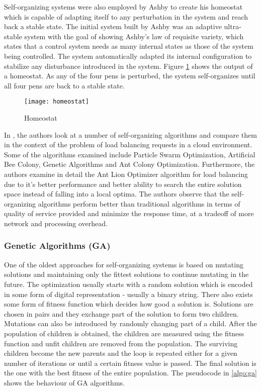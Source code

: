 Self-organizing systems were also employed by Ashby to create his homeostat \cite{ashby:homeostat} which is capable of adapting itself to any perturbation in the system and reach back a stable state. The initial system built by Ashby was an adaptive ultra-stable system with the goal of showing Ashby's law of requisite variety, which states that a control system needs as many internal states as those of the system being controlled. The system automatically adapted its internal configuration to stabilize any disturbance introduced in the system. Figure \ref{fig:homeostat} shows the output of a homeostat. As any of the four pens is perturbed, the system self-organizes until all four pens are back to a stable state.

\begin{figure}
	\centering
		\texttt{[image: homeostat]}
	\caption{Homeostat}
	\label{fig:homeostat}
\end{figure}

In \cite{selforg:survey}, the authors look at a number of self-organizing algorithms and compare them in the context of the problem of load balancing requests in a cloud environment. Some of the algorithms examined include Particle Swarm Optimization, Artificial Bee Colony, Genetic Algorithms and Ant Colony Optimization. Furthermore, the authors examine in detail the Ant Lion Optimizer algorithm for load balancing due to it's better performance and better ability to search the entire solution space instead of falling into a local optima. The authors observe that the self-organizing algorithms perform better than traditional algorithms in terms of quality of service provided and minimize the response time, at a tradeoff of more network and processing overhead.

\subsubsection{Genetic Algorithms (GA)}

One of the oldest approaches for self-organizing systems is based on mutating solutions and maintaining only the fittest solutions to continue mutating in the future. The optimization usually starts with a random solution which is encoded in some form of digital representation - usually a binary string. There also exists some form of fitness function which decides how good a solution is. Solutions are chosen in pairs and they exchange part of the solution to form two children. Mutations can also be introduced by randomly changing part of a child. After the population of children is obtained, the children are measured using the fitness function and unfit children are removed from the population. The surviving children become the new parents and the loop is repeated either for a given number of iterations or until a certain fitness value is passed. The final solution is the one with the best fitness of the entire population. The pseudocode in \ref{algo:ga} shows the behaviour of GA algorithms.

